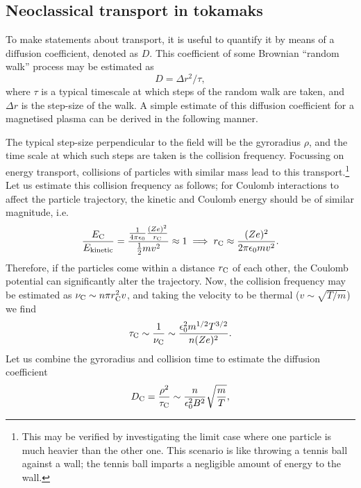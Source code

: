 \subsection*{Neoclassical transport in tokamaks}
To make statements about transport, it is useful to quantify it by means of a diffusion coefficient, denoted as $D$. This coefficient of some Brownian ``random walk'' process may be estimated as
\begin{equation*}
    D = \Delta r^2/\tau,
\end{equation*}
where $\tau$ is a typical timescale at which steps of the random walk are taken, and $\Delta r$ is the step-size of the walk. A simple estimate of this diffusion coefficient for a magnetised plasma can be derived in the following manner. \par 
The typical step-size perpendicular to the field will be the gyroradius $\rho$, and the time scale at which such steps are taken is the collision frequency. Focussing on energy transport, collisions of particles with similar mass lead to this transport.\footnote{This may be verified by investigating the limit case where one particle is much heavier than the other one. This scenario is like throwing a tennis ball against a wall; the tennis ball imparts a negligible amount of energy to the wall.} Let us estimate this collision frequency as follows; for Coulomb interactions to affect the particle trajectory, the kinetic and Coulomb energy should be of similar magnitude, i.e.
\begin{equation*}
    \frac{E_{\rm C}}{E_{\rm kinetic}} = \frac{\frac{1}{4\pi \epsilon_0} \frac{(Ze)^2}{r_{\rm C}} }{\frac{1}{2} m v^2} \approx 1 \implies r_{\rm C} \approx \frac{(Ze)^2}{2 \pi \epsilon_0 m v^2}.
\end{equation*}
Therefore, if the particles come within a distance $r_{\rm C}$ of each other, the Coulomb potential can significantly alter the trajectory. Now, the collision frequency may be estimated as $\nu_{\rm C} \sim n \pi r_{\rm C}^2 v$, and taking the velocity to be thermal ($v \sim \sqrt{T/m}$) we find
\begin{equation*}
    \tau_{\rm C} \sim  \frac{1}{\nu_{\rm C}} \sim \frac{\epsilon_0^2 m^{1/2} T^{3/2}}{n (Ze)^2}.
\end{equation*}
Let us combine the gyroradius and collision time to estimate the diffusion coefficient
\begin{equation}
    D_{\rm C} = \frac{\rho^2}{\tau_{\rm C}} \sim \frac{n}{\epsilon_0^2 B^2} \sqrt{\frac{m}{T}},
\end{equation}
